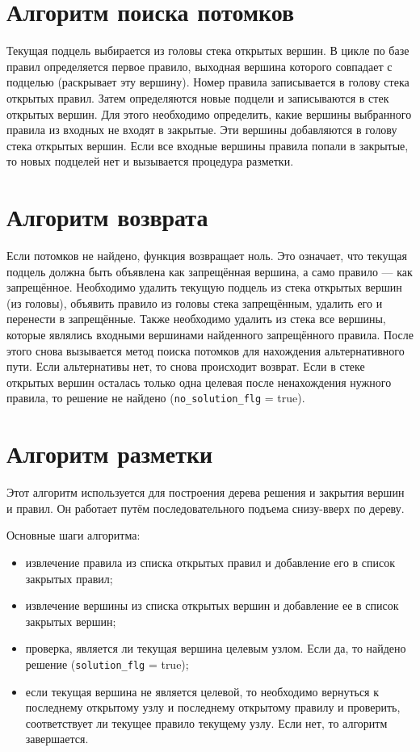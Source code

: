 \documentclass{bmstu}
\begin{document}
\section{Алгоритм поиска потомков}

Текущая подцель выбирается из головы стека открытых вершин. В цикле по базе правил определяется первое правило, выходная вершина которого совпадает с подцелью (раскрывает эту вершину). Номер правила записывается в голову стека открытых правил. Затем определяются новые подцели и записываются в стек открытых вершин. Для этого необходимо определить, какие вершины выбранного правила из входных не входят в закрытые. Эти вершины добавляются в голову стека открытых вершин. Если все входные вершины правила попали в закрытые, то новых подцелей нет и вызывается процедура разметки.

\section{Алгоритм возврата}

Если потомков не найдено, функция возвращает ноль. Это означает, что текущая подцель должна быть объявлена как запрещённая вершина, а само правило --- как запрещённое. Необходимо удалить текущую подцель из стека открытых вершин (из головы), объявить правило из головы стека запрещённым, удалить его и перенести в запрещённые. Также необходимо удалить из стека все вершины, которые являлись входными вершинами найденного запрещённого правила. После этого снова вызывается метод поиска потомков для нахождения альтернативного пути. Если альтернативы нет, то снова происходит возврат. Если в стеке открытых вершин осталась только одна целевая после ненахождения нужного правила, то решение не найдено (\texttt{no\_solution\_flg} = true).

\section{Алгоритм разметки}

Этот алгоритм используется для построения дерева решения и закрытия вершин и правил. Он работает путём
последовательного подъема снизу-вверх по дереву.

Основные шаги алгоритма:
\begin{itemize}
    \item извлечение правила из списка открытых правил и добавление его в список закрытых правил;
    \item извлечение вершины из списка открытых вершин и добавление ее в список закрытых вершин;
    \item проверка, является ли текущая вершина целевым узлом. Если да, то найдено решение (\texttt{solution\_flg} = true);
    \item если текущая вершина не является целевой, то необходимо вернуться к последнему открытому узлу и
    последнему открытому правилу и проверить, соответствует ли текущее правило текущему узлу. Если нет,
    то алгоритм завершается.
\end{itemize}
\end{document}
